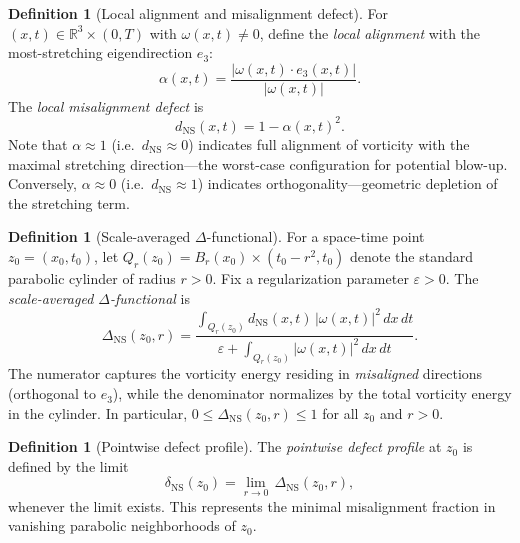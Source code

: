 \documentclass[11pt]{article}
\theoremstyle{definition}
\newtheorem{definition}[theorem]{Definition}
\theoremstyle{remark}
\newcommand{\R}{\mathbb{R}}
\newcommand{\eps}{\varepsilon}
\begin{document}
\begin{definition}[Local alignment and misalignment defect]
\label{def:alignment-defect}
For $(x,t) \in \R^3 \times (0,T)$ with $\omega(x,t) \neq 0$, define the
\emph{local alignment} with the most-stretching eigendirection $e_3$:
\begin{equation}\label{eq:alpha}
\alpha(x,t) = \frac{|\omega(x,t) \cdot e_3(x,t)|}{|\omega(x,t)|}.
\end{equation}
The \emph{local misalignment defect} is
\begin{equation}\label{eq:d-ns}
d_{\mathrm{NS}}(x,t) = 1 - \alpha(x,t)^2.
\end{equation}
Note that $\alpha \approx 1$ (i.e.\ $d_{\mathrm{NS}} \approx 0$) indicates
full alignment of vorticity with the maximal stretching direction---the
worst-case configuration for potential blow-up.  Conversely,
$\alpha \approx 0$ (i.e.\ $d_{\mathrm{NS}} \approx 1$) indicates
orthogonality---geometric depletion of the stretching term.
\end{definition}

\begin{definition}[Scale-averaged $\Delta$-functional]
\label{def:delta-functional}
For a space-time point $z_0 = (x_0, t_0)$, let
$Q_r(z_0) = B_r(x_0) \times (t_0 - r^2, t_0)$ denote the standard
parabolic cylinder of radius $r > 0$.  Fix a regularization parameter
$\eps > 0$.  The \emph{scale-averaged $\Delta$-functional} is
\begin{equation}\label{eq:Delta-NS}
\Delta_{\mathrm{NS}}(z_0, r)
= \frac{\displaystyle\int_{Q_r(z_0)} d_{\mathrm{NS}}(x,t)\,|\omega(x,t)|^2\,dx\,dt}
       {\eps + \displaystyle\int_{Q_r(z_0)} |\omega(x,t)|^2\,dx\,dt}.
\end{equation}
The numerator captures the vorticity energy residing in \emph{misaligned}
directions (orthogonal to $e_3$), while the denominator normalizes by the
total vorticity energy in the cylinder.  In particular,
$0 \leq \Delta_{\mathrm{NS}}(z_0, r) \leq 1$ for all $z_0$ and $r > 0$.
\end{definition}

\begin{definition}[Pointwise defect profile]
\label{def:pointwise-defect}
The \emph{pointwise defect profile} at $z_0$ is defined by the limit
\begin{equation}\label{eq:delta-ns-pointwise}
\delta_{\mathrm{NS}}(z_0)
= \lim_{r \to 0}\, \Delta_{\mathrm{NS}}(z_0, r),
\end{equation}
whenever the limit exists.  This represents the minimal misalignment
fraction in vanishing parabolic neighborhoods of $z_0$.
\end{definition}
\end{document}
